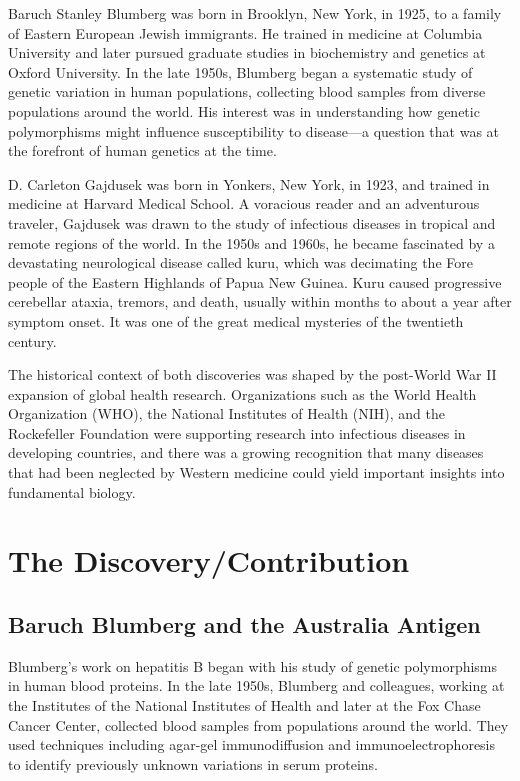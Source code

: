 Baruch Stanley Blumberg was born in Brooklyn, New York, in 1925, to a family of Eastern European Jewish immigrants. He trained in medicine at Columbia University and later pursued graduate studies in biochemistry and genetics at Oxford University. In the late 1950s, Blumberg began a systematic study of genetic variation in human populations, collecting blood samples from diverse populations around the world. His interest was in understanding how genetic polymorphisms might influence susceptibility to disease---a question that was at the forefront of human genetics at the time.

D. Carleton Gajdusek was born in Yonkers, New York, in 1923, and trained in medicine at Harvard Medical School. A voracious reader and an adventurous traveler, Gajdusek was drawn to the study of infectious diseases in tropical and remote regions of the world. In the 1950s and 1960s, he became fascinated by a devastating neurological disease called kuru, which was decimating the Fore people of the Eastern Highlands of Papua New Guinea. Kuru caused progressive cerebellar ataxia, tremors, and death, usually within months to about a year after symptom onset. It was one of the great medical mysteries of the twentieth century.

The historical context of both discoveries was shaped by the post-World War II expansion of global health research. Organizations such as the World Health Organization (WHO), the National Institutes of Health (NIH), and the Rockefeller Foundation were supporting research into infectious diseases in developing countries, and there was a growing recognition that many diseases that had been neglected by Western medicine could yield important insights into fundamental biology.

\section{The Discovery/Contribution}

\subsection{Baruch Blumberg and the Australia Antigen}

Blumberg's work on hepatitis B began with his study of genetic polymorphisms in human blood proteins. In the late 1950s, Blumberg and colleagues, working at the Institutes of the National Institutes of Health and later at the Fox Chase Cancer Center, collected blood samples from populations around the world. They used techniques including agar-gel immunodiffusion and immunoelectrophoresis to identify previously unknown variations in serum proteins.

